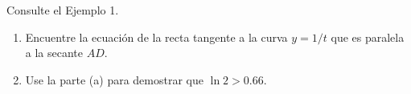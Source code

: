 \item Consulte el Ejemplo 1. 
    \begin{enumerate}
        \item[(a)] Encuentre la ecuación de la recta tangente a la curva $y = 1/t$ que es paralela a la secante $AD$.
        \item[(b)] Use la parte (a) para demostrar que $\ln 2 > 0.66$.
    \end{enumerate}
